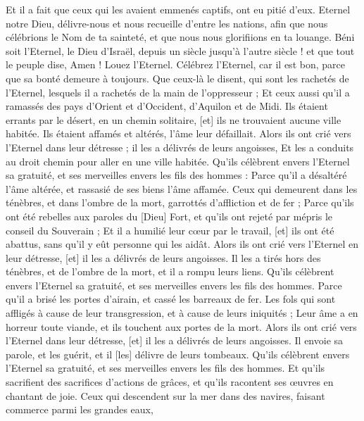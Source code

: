 \begin{multicols}{2}
Et il a fait que ceux qui les avaient emmenés captifs, ont eu pitié d'eux.
Eternel notre Dieu, délivre-nous et nous recueille d'entre les nations, afin que nous célébrions le Nom de ta sainteté, et que nous nous glorifiions en ta louange.
Béni soit l'Eternel, le Dieu d'Israël, depuis un siècle jusqu’à l'autre siècle ! et que tout le peuple dise, Amen ! Louez l'Eternel.
\VerseOne{}Célébrez l'Eternel, car il est bon, parce que sa bonté demeure à toujours.
Que ceux-là le disent, qui sont les rachetés de l'Eternel, lesquels il a rachetés de la main de l'oppresseur ;
Et ceux aussi qu'il a ramassés des pays d'Orient et d'Occident, d'Aquilon et de Midi.
Ils étaient errants par le désert, en un chemin solitaire, [et] ils ne trouvaient aucune ville habitée.
Ils étaient affamés et altérés, l'âme leur défaillait.
Alors ils ont crié vers l'Eternel dans leur détresse ; il les a délivrés de leurs angoisses,
Et les a conduits au droit chemin pour aller en une ville habitée.
Qu'ils célèbrent envers l'Eternel sa gratuité, et ses merveilles envers les fils des hommes :
Parce qu'il a désaltéré l'âme altérée, et rassasié de ses biens l'âme affamée.
Ceux qui demeurent dans les ténèbres, et dans l'ombre de la mort, garrottés d'affliction et de fer ;
Parce qu'ils ont été rebelles aux paroles du [Dieu] Fort, et qu'ils ont rejeté par mépris le conseil du Souverain ;
Et il a humilié leur cœur par le travail, [et] ils ont été abattus, sans qu'il y eût personne qui les aidât.
Alors ils ont crié vers l'Eternel en leur détresse, [et] il les a délivrés de leurs angoisses.
Il les a tirés hors des ténèbres, et de l'ombre de la mort, et il a rompu leurs liens.
Qu'ils célèbrent envers l'Eternel sa gratuité, et ses merveilles envers les fils des hommes.
Parce qu'il a brisé les portes d'airain, et cassé les barreaux de fer.
Les fols qui sont affligés à cause de leur transgression, et à cause de leurs iniquités ;
Leur âme a en horreur toute viande, et ils touchent aux portes de la mort.
Alors ils ont crié vers l'Eternel dans leur détresse, [et] il les a délivrés de leurs angoisses.
Il envoie sa parole, et les guérit, et il [les] délivre de leurs tombeaux.
Qu'ils célèbrent envers l'Eternel sa gratuité, et ses merveilles envers les fils des hommes.
Et qu'ils sacrifient des sacrifices d'actions de grâces, et qu'ils racontent ses œuvres en chantant de joie.
Ceux qui descendent sur la mer dans des navires, faisant commerce parmi les grandes eaux,

\end{multicols}
